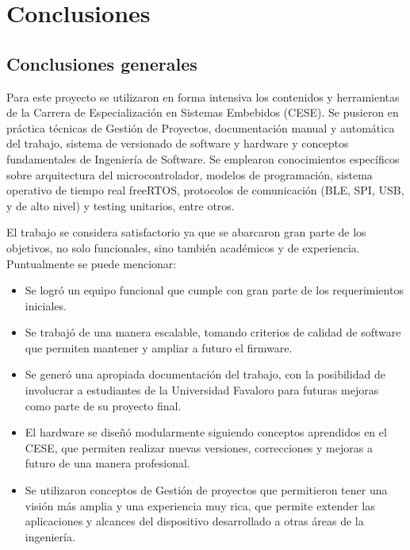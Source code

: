 
\chapter{Conclusiones} %

\label{Chapter5} %




\section{Conclusiones generales }

Para este proyecto se utilizaron en forma intensiva los contenidos y herramientas de la Carrera de Especialización en Sistemas Embebidos (CESE). Se pusieron en práctica técnicas de Gestión de Proyectos, documentación manual y automática del trabajo, sistema de versionado de software y hardware y conceptos fundamentales de Ingeniería de Software. Se emplearon conocimientos específicos sobre arquitectura del microcontrolador, modelos de programación, sistema operativo de tiempo real freeRTOS, protocolos de comunicación (BLE, SPI, USB, y de alto nivel) y testing unitarios, entre otros.

El trabajo se considera satisfactorio ya que se abarcaron gran parte de los objetivos, no solo funcionales, sino también académicos y de experiencia. Puntualmente se puede mencionar:

\begin{itemize}

\item Se logró un equipo funcional que cumple con gran parte de los requerimientos iniciales.

\item Se trabajó de una manera escalable, tomando criterios de calidad de software que permiten mantener y ampliar a futuro el firmware.

\item Se generó una apropiada documentación del trabajo, con la posibilidad de involucrar a estudiantes de la Universidad Favaloro para futuras mejoras como parte de su proyecto final.

\item El hardware se diseñó modularmente siguiendo conceptos aprendidos en el CESE, que permiten realizar nuevas versiones, correcciones y mejoras a futuro de una manera profesional.

\item Se utilizaron conceptos de Gestión de proyectos que permitieron tener una visión más amplia y una experiencia muy rica, que permite extender las aplicaciones y alcances del dispositivo desarrollado a otras áreas de la ingeniería.

\end{itemize}

